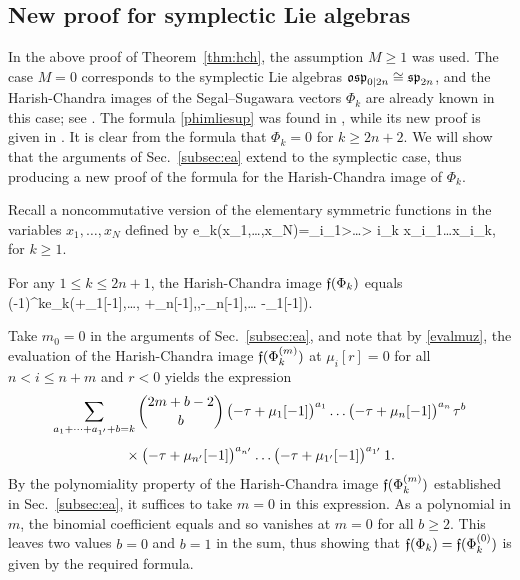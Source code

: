 \documentclass[12pt]{article}
\begin{document}
\subsection{New proof for symplectic Lie algebras}
\label{subsec:np}

In the above proof of Theorem~\ref{thm:hch}, the assumption $M\geqslant 1$ was used.
The case $M=0$ corresponds to the symplectic Lie algebras $\mathfrak{osp}_{0|2n}\cong\mathfrak{sp}_{2n}$,
and the Harish-Chandra images of the Segal--Sugawara vectors
$\Phi^{}_{k}$ are already known in this case; see \cite[Sec.~13.1]{m:so}.
The formula \eqref{phimliesup} was found in \cite{m:ss}, while its new proof
is given in \cite{mn:ss}. It is clear from the formula that
$\Phi_k=0$ for $k\geqslant 2n+2$.
We will show that the arguments of Sec.~\ref{subsec:ea}
extend to the symplectic case, thus producing a new proof of the formula for
the Harish-Chandra image of $\Phi^{}_{k}$.

Recall a noncommutative version of the elementary symmetric functions
in the variables $x_1,\dots,x_N$
defined by
e_k(x_1,\dots,x_N)=\sum_{i_1>\dots> i_k}
x_{i_1}\dots x_{i_k},
\eeq
for $k\geqslant 1$.

\bth\label{thm:sphch}
For any $1\leqslant k\leqslant 2n+1$,
the Harish-Chandra image $\mathfrak{f}(\Phi_k)$ equals
\ben
(-1)^k\ts e_k\big(\tau+\mu_{1}[-1],\dots,
\tau+\mu_{n}[-1],\tau,\tau-\mu_{n}[-1],\dots
\tau-\mu_{1}[-1]\big).
\een
\eth

\bpf
Take $m_0=0$ in the arguments of Sec.~\ref{subsec:ea}, and note that by \eqref{evalmuz},
the evaluation of the Harish-Chandra image $\mathfrak{f}(\Phi^{(m)}_k)$ at
$\mu_i[r]=0$ for all $n<i\leqslant n+m$ and $r<0$ yields the expression
\begin{multline}\label{evalmuzer}
\sum_{a_1+\dots+a_{1'}+b=k}\binom{2m+b-2}{b}\,
\big({-}\tau+\mu_{1}[-1]\big)^{a_1}\dots \big({-}\tau+\mu_{n}[-1]\big)^{a_n}\hspace{1pt} \tau^b\\[0.4em]
{}\times \big({-}\tau+\mu_{n'}[-1]\big)^{a_{n'}}\dots \big({-}\tau+\mu_{1'}[-1]\big)^{a_{1'}}\, 1.
\end{multline}
By the polynomiality property of the Harish-Chandra image $\mathfrak{f}(\Phi^{(m)}_k)$
established in Sec.~\ref{subsec:ea},
it suffices to take $m=0$ in this expression. As a polynomial in $m$,
the binomial coefficient equals
\ben
{}
\een
and so
vanishes at $m=0$ for all $b\geqslant 2$. This leaves two values $b=0$ and $b=1$ in the sum,
thus showing that  $\mathfrak{f}(\Phi_k)=\mathfrak{f}(\Phi^{(0)}_k)$ is given by the required formula.
\epf
\end{document}
